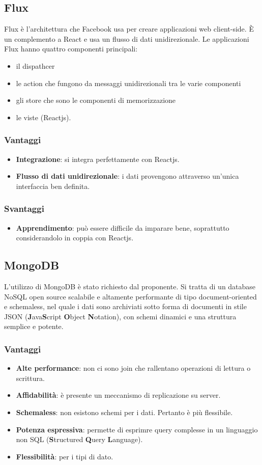\subsection{Flux}
Flux è l'architettura che Facebook usa per creare applicazioni web client-side. È un complemento a React e usa un flusso di dati unidirezionale. Le applicazioni Flux hanno quattro componenti principali: 
\begin{itemize}
\item il dispathcer 
\item le action che fungono da messaggi unidirezionali tra le varie componenti
\item gli store che sono le componenti di memorizzazione
\item le viste (Reactjs).
\end{itemize}
\subsubsection{Vantaggi}
\begin{itemize}
\item \textbf{Integrazione}: si integra perfettamente con Reactjs.
\item \textbf{Flusso di dati unidirezionale}: i dati provengono attraverso un'unica interfaccia ben definita.
\end{itemize}
\subsubsection{Svantaggi}
\begin{itemize}
\item \textbf{Apprendimento}: può essere difficile da imparare bene, soprattutto considerandolo in coppia con Reactjs.
\end{itemize}
\subsection{MongoDB}
L'utilizzo di MongoDB \`e stato richiesto dal proponente. Si tratta di un database NoSQL open source scalabile e altamente performante di tipo document-oriented e schemaless, nel quale i dati sono archiviati sotto forma di documenti in stile JSON (\textbf{J}ava\textbf{S}cript \textbf{O}bject \textbf{N}otation), con schemi dinamici e una struttura semplice e potente.
\subsubsection{Vantaggi}
\begin{itemize}
\item \textbf{Alte performance}: non ci sono join che rallentano operazioni di lettura o scrittura. 
\item \textbf{Affidabilit\`a}: \`e presente un meccanismo di replicazione su server.
\item \textbf{Schemaless}: non esistono schemi per i dati. Pertanto \`e pi\`u flessibile.
\item \textbf{Potenza espressiva}: permette di esprimre query complesse in un linguaggio non SQL (\textbf{S}tructured \textbf{Q}uery \textbf{L}anguage).
\item \textbf{Flessibilit\`a}: per i tipi di dato.
\end{itemize}
